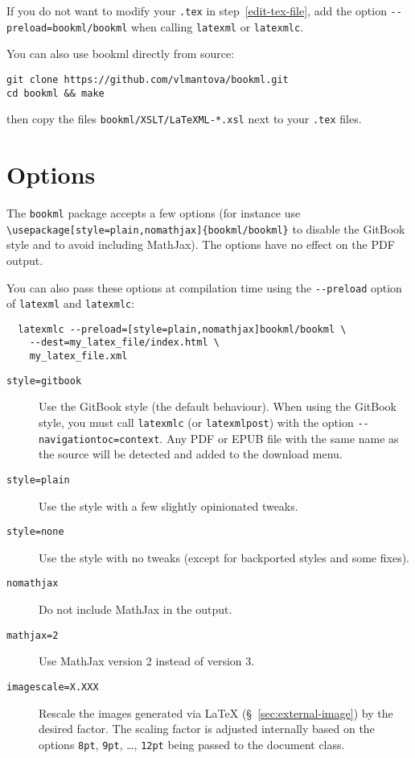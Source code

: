\documentclass[a4paper,british]{article}
\def\ltxinline{\lstinline[style=bookml]}
\begin{document}
If you do not want to modify your \lstinline|.tex| in step~\ref{edit-tex-file}, add the option \lstinline|--preload=bookml/bookml| when calling \lstinline|latexml| or \lstinline|latexmlc|.

You can also use bookml directly from source:
\begin{lstlisting}
git clone https://github.com/vlmantova/bookml.git
cd bookml && make
\end{lstlisting}
then copy the files \lstinline|bookml/XSLT/LaTeXML-*.xsl| next to your \lstinline|.tex| files.

\section{Options}

The \ltxinline|bookml| package accepts a few options (for instance use \ltxinline|\usepackage[style=plain,nomathjax]{bookml/bookml}| to disable the GitBook style and to avoid including MathJax). The options have no effect on the PDF output.

You can also pass these options at compilation time using the \ltxinline|--preload| option of \ltxinline|latexml| and \ltxinline|latexmlc|:
\begin{lstlisting}
  latexmlc --preload=[style=plain,nomathjax]bookml/bookml \
    --dest=my_latex_file/index.html \
    my_latex_file.xml
\end{lstlisting}

\begin{description}
  \item[\texttt{style=gitbook}] Use the GitBook style (the default behaviour). When using the GitBook style, you must call \ltxinline|latexmlc| (or \ltxinline|latexmlpost|) with the option \ltxinline|--navigationtoc=context|. Any PDF or EPUB file with the same name as the source will be detected and added to the download menu.
  \item[\texttt{style=plain}] Use the \LaTeXML{} style with a few slightly opinionated tweaks.
  \item[\texttt{style=none}] Use the \LaTeXML{} style with no tweaks (except for backported styles and some fixes).
  \item[\texttt{nomathjax}] Do not include MathJax in the output.
  \item[\texttt{mathjax=2}] Use MathJax version 2 instead of version 3.
  \item[\texttt{imagescale=X.XXX}] Rescale the images generated via \LaTeX{} (\S~\ref{sec:external-image}) by the desired factor. The scaling factor is adjusted internally based on the options \ltxinline|8pt|, \ltxinline|9pt|, \dots, \ltxinline|12pt| being passed to the document class.
\end{description}
\end{document}
